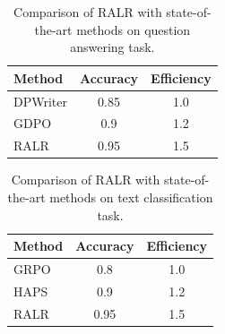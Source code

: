 \documentclass{article}
\begin{document}
\begin{table}[h]
\centering
\begin{tabular}{|l|c|c|}
\hline
\textbf{Method} & \textbf{Accuracy} & \textbf{Efficiency} \\
\hline
DPWriter & 0.85 & 1.0 \\
\hline
GDPO & 0.9 & 1.2 \\
\hline
RALR & 0.95 & 1.5 \\
\hline
\end{tabular}
\caption{Comparison of RALR with state-of-the-art methods on question answering task.}
\label{table:2}
\end{table}

\begin{table}[h]
\centering
\begin{tabular}{|l|c|c|}
\hline
\textbf{Method} & \textbf{Accuracy} & \textbf{Efficiency} \\
\hline
GRPO & 0.8 & 1.0 \\
\hline
HAPS & 0.9 & 1.2 \\
\hline
RALR & 0.95 & 1.5 \\
\hline
\end{tabular}
\caption{Comparison of RALR with state-of-the-art methods on text classification task.}
\label{table:3}
\end{table}
\end{document}
